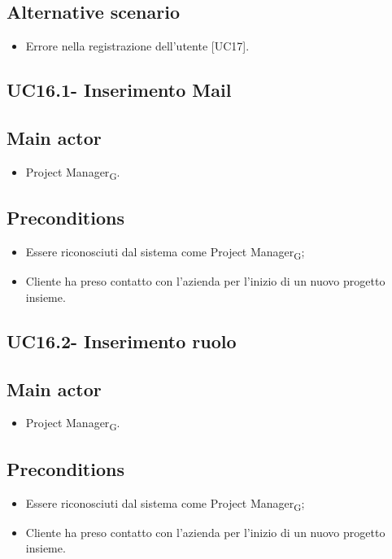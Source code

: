 \documentclass{article}
\begin{document}
    \subsection*{Alternative scenario}
        \begin{itemize}
            \item Errore nella registrazione dell'utente [UC17].
        \end{itemize}

    \subsection{UC16.1- Inserimento Mail}
    \subsection*{Main actor}
        \begin{itemize}
            \item Project Manager\textsubscript{G}.
        \end{itemize}
        
    \subsection*{Preconditions}
        \begin{itemize}
            \item Essere riconosciuti dal sistema come Project Manager\textsubscript{G};
            \item Cliente ha preso contatto con l'azienda per l'inizio di un nuovo progetto insieme.
        \end{itemize}
        

    \subsection{UC16.2- Inserimento ruolo}
    \subsection*{Main actor}
        \begin{itemize}
            \item Project Manager\textsubscript{G}.
        \end{itemize}
        
    \subsection*{Preconditions}
        \begin{itemize}
            \item Essere riconosciuti dal sistema come Project Manager\textsubscript{G};
            \item Cliente ha preso contatto con l'azienda per l'inizio di un nuovo progetto insieme.
        \end{itemize}
        
\end{document}
